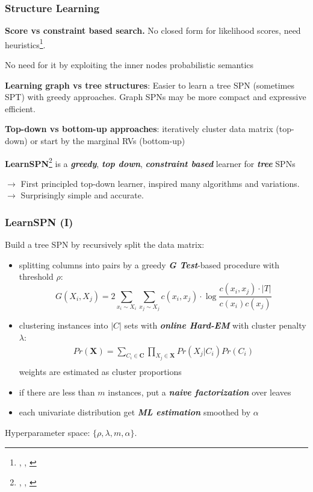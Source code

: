 \documentclass[10pt, t, xcolor={usenames,dvipsnames,svgnames}, compress]{beamer}
\newcommand{\customcite}[1]{\footnote{\scriptsize \citeauthor{#1}, \citetitle{#1}, \citeyear{#1}}}
\begin{document}
\begin{frame}
  \frametitle{Structure Learning}

  \textbf{Score vs constraint based search.}
  No closed form for likelihood scores, need
  heuristics\customcite{Rooshenas2014}.\par
  No need for it by exploiting the inner nodes probabilistic semantics\par\bigskip
  
  \textbf{Learning graph vs tree structures}:
  Easier to learn a tree SPN (sometimes SPT) with greedy
  approaches. Graph SPNs may be more compact and expressive efficient.\par\bigskip

  \textbf{Top-down vs bottom-up approaches}: iteratively cluster data
  matrix (top-down) or start by the marginal RVs (bottom-up)\par\bigskip

  \textbf{LearnSPN}\customcite{Gens2013} is a \emph{\textbf{greedy}}, \emph{\textbf{top down}}, \emph{\textbf{constraint
  based}} learner for \emph{\textbf{tree}} SPNs\par
  $\rightarrow$ First principled top-down learner, inspired many algorithms and
  variations.
  $\rightarrow$ Surprisingly simple and accurate.
\end{frame}



\begin{frame}[t]
  \frametitle{LearnSPN (I)}
  Build a tree SPN by recursively split the data matrix:

  \begin{itemize}
  \item splitting columns into pairs by a greedy \textbf{\emph{G Test}}-based
    procedure with threshold $\rho$:
    \[
      G(X_i, X_j) =  2\sum_{x_i \sim X_i}\sum_{x_j \sim X_j}c(x_i, x_j)\cdot \log\frac{c(x_i, x_j)\cdot |T|}{c(x_i)c(x_j)}
    \]
  \item clustering instances into $|C|$ sets with \textbf{\emph{online Hard-EM}} with cluster penalty
    $\lambda$:
    \[\begin{array}{cc}
        Pr(\mathbf{X})= \sum_{C_i \in \mathbf{C}}\prod_{X_j \in \mathbf{X}}Pr(X_j|C_i)Pr(C_i)\\
      \end{array}\]
    weights are estimated as cluster proportions
  \item if there are less than $m$ instances, put a \textbf{\emph{naive
        factorization}} over leaves
  \item each univariate distribution get \emph{\textbf{ML estimation}} smoothed by $\alpha$  
  \end{itemize}\par\bigskip

  Hyperparameter space: $\{\rho, \lambda, m, \alpha\}$.
\end{frame}
\end{document}
